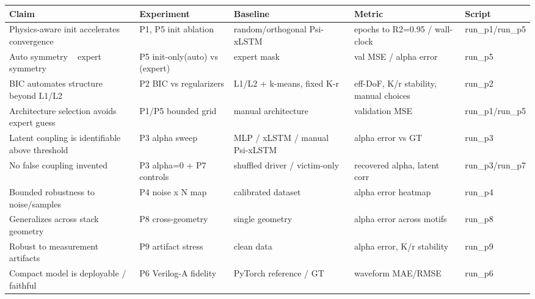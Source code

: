 \begin{tabular}{lllll}
\toprule
Claim & Experiment & Baseline & Metric & Script \\
\midrule
Physics-aware init accelerates convergence & P1, P5 init ablation & random/orthogonal Psi-xLSTM & epochs to R2=0.95 / wall-clock & run_p1/run_p5 \\
Auto symmetry ~ expert symmetry & P5 init-only(auto) vs (expert) & expert mask & val MSE / alpha error & run_p5 \\
BIC automates structure beyond L1/L2 & P2 BIC vs regularizers & L1/L2 + k-means, fixed K-r & eff-DoF, K/r stability, manual choices & run_p2 \\
Architecture selection avoids expert guess & P1/P5 bounded grid & manual architecture & validation MSE & run_p1/run_p5 \\
Latent coupling is identifiable above threshold & P3 alpha sweep & MLP / xLSTM / manual Psi-xLSTM & alpha error vs GT & run_p3 \\
No false coupling invented & P3 alpha=0 + P7 controls & shuffled driver / victim-only & recovered alpha, latent corr & run_p3/run_p7 \\
Bounded robustness to noise/samples & P4 noise x N map & calibrated dataset & alpha error heatmap & run_p4 \\
Generalizes across stack geometry & P8 cross-geometry & single geometry & alpha error across motifs & run_p8 \\
Robust to measurement artifacts & P9 artifact stress & clean data & alpha error, K/r stability & run_p9 \\
Compact model is deployable / faithful & P6 Verilog-A fidelity & PyTorch reference / GT & waveform MAE/RMSE & run_p6 \\
\bottomrule
\end{tabular}
